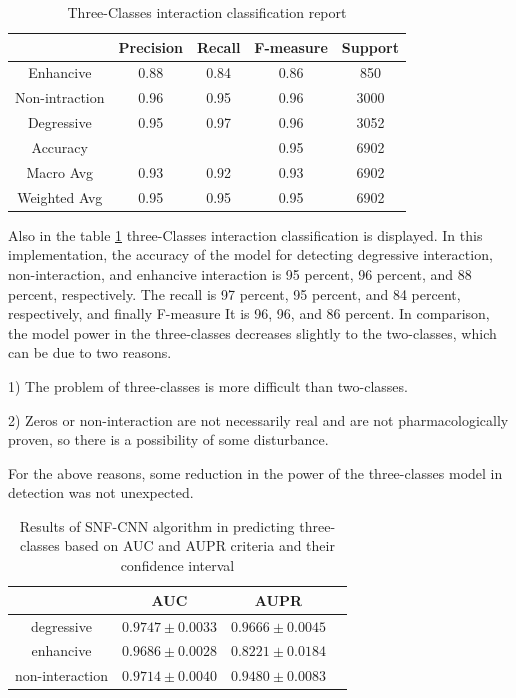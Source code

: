 \documentclass{bmcart}
\begin{document}
\begin{table}[h!]
\centering
\begin{tabular}{|c|c|c|c|c|}
\hline
& Precision & Recall & F-measure & Support  \\
\hline
Enhancive & 0.88 & 0.84 & 0.86 & 850\\
\hline
Non-intraction & 0.96 & 0.95 & 0.96 & 3000\\
\hline
Degressive & 0.95 & 0.97 & 0.96 & 3052\\
\hline
Accuracy &  & & 0.95 &6902\\
\hline
Macro Avg & 0.93 & 0.92 & 0.93 & 6902 \\
\hline
Weighted Avg & 0.95 & 0.95 &0.95 & 6902\\
\hline
\end{tabular}
\newline
	\caption{Three-Classes interaction classification report}
	\label{TripleclassificatonReport}
\end{table}

Also in the table
\ref{TripleclassificatonReport}
three-Classes interaction classification is displayed. In this implementation, the accuracy of the model for detecting degressive interaction, non-interaction, and enhancive interaction is 95 percent, 96 percent, and 88 percent, respectively. The recall is 97 percent, 95 percent, and 84 percent, respectively, and finally F-measure It is 96, 96, and 86 percent. In comparison, the model power in the three-classes decreases slightly to the two-classes, which can be due to two reasons.

1) The problem of three-classes is more difficult than two-classes.

2) Zeros or non-interaction are not necessarily real and are not pharmacologically proven, so there is a possibility of some disturbance.

For the above reasons, some reduction in the power of the three-classes model in detection was not unexpected.

\begin{table}[h!]
\centering 
\begin{tabular}{|c|c|c|c|}
\hline
& AUC & AUPR\\
\hline
degressive	& $0.9747 \pm 0.0033$ & $0.9666 \pm 0.0045$\\
\hline
enhancive  & $0.9686 \pm 0.0028$ & $0.8221 \pm 0.0184$\\
\hline
non-interaction & $0.9714 \pm 0.0040$ & $0.9480 \pm 0.0083$\\
\hline
\end{tabular}
\newline
	\caption{Results of SNF-CNN algorithm in predicting three-classes based on AUC and AUPR criteria and their confidence interval}
	\label{SNF-CNNresult}
\end{table}
\end{document}
